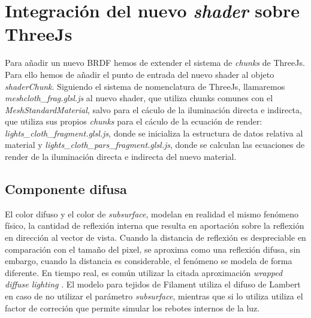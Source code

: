 


\vspace{1cm}
\section{Integraci\'on del nuevo \textit{shader} sobre ThreeJs}
  Para a\~nadir un nuevo BRDF hemos de extender el sistema de \textit{chunks} de ThreeJs. Para ello hemos de a\~nadir el
  punto de entrada del nuevo shader al objeto \textit{shaderChunk}. Siguiendo el sistema de nomenclatura de ThreeJs,
  llamaremos \textit{meshcloth\_frag.glsl.js} al nuevo shader, que utiliza chunks comunes con el \textit{MeshStandardMaterial},
  salvo para el c\'aculo de la iluminaci\'on directa e indirecta, que utiliza sus propios \textit{chunks} para el c\'aculo
  de la ecuaci\'on de render: \textit{lights\_cloth\_fragment.glsl.js}, donde se inicializa la estructura de datos relativa
  al material y \textit{lights\_cloth\_pars\_fragment.glsl.js}, donde se calculan las ecuaciones de render de la iluminaci\'on
  directa e indirecta del nuevo material.

  \subsection{Componente difusa}
  El color difuso y el color de \textit{subsurface}, modelan en realidad el mismo fen\'omeno f\'isico, la cantidad de reflexi\'on
  interna que resulta en aportaci\'on sobre la reflexi\'on en direcci\'on al vector de vista. Cuando la distancia de reflexi\'on
  es despreciable en comparaci\'on con el tama\~no del pixel, se aproxima como una reflexi\'on difusa, sin embargo, cuando
  la distancia es considerable, el fen\'omeno se modela de forma diferente. En tiempo real, es com\'un utilizar la citada aproximaci\'on
  \textit{wrapped diffuse lighting} \autocite{orennayar}.
  El modelo para tejidos de Filament utiliza el difuso de Lambert en caso de no utilizar el par\'ametro \textit{subsurface},
  mientras que si lo utiliza utiliza el factor de correci\'on que permite simular los rebotes internos de la luz.

